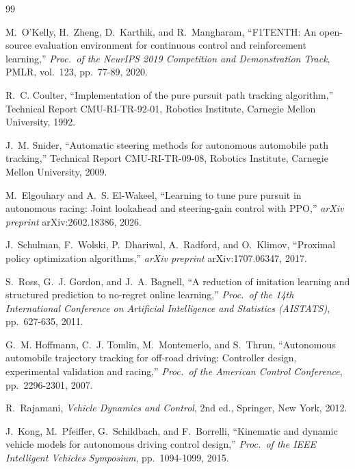 \documentclass[10pt,twocolumn,twoside]{article}
\begin{document}
\renewcommand{\refname}{References}
{\fontsize{9}{10.8}\selectfont
\begin{thebibliography}{99}
\setlength{\itemsep}{1pt}

M.~O'Kelly, H.~Zheng, D.~Karthik, and R.~Mangharam, ``F1TENTH: An
open-source evaluation environment for continuous control and reinforcement
learning,'' \emph{Proc.\ of the NeurIPS 2019 Competition and Demonstration
Track}, PMLR, vol.~123, pp.~77-89, 2020.

R.~C. Coulter, ``Implementation of the pure pursuit path tracking algorithm,''
Technical Report CMU-RI-TR-92-01, Robotics Institute, Carnegie Mellon
University, 1992.

J.~M. Snider, ``Automatic steering methods for autonomous automobile path
tracking,'' Technical Report CMU-RI-TR-09-08, Robotics Institute, Carnegie
Mellon University, 2009.

M.~Elgouhary and A.~S. El-Wakeel, ``Learning to tune pure pursuit in
autonomous racing: Joint lookahead and steering-gain control with PPO,''
\emph{arXiv preprint} arXiv:2602.18386, 2026.

J.~Schulman, F.~Wolski, P.~Dhariwal, A.~Radford, and O.~Klimov, ``Proximal
policy optimization algorithms,'' \emph{arXiv preprint} arXiv:1707.06347, 2017.

S.~Ross, G.~J. Gordon, and J.~A. Bagnell, ``A reduction of imitation learning
and structured prediction to no-regret online learning,'' \emph{Proc.\ of the
14th International Conference on Artificial Intelligence and Statistics
(AISTATS)}, pp.~627-635, 2011.

G.~M. Hoffmann, C.~J. Tomlin, M.~Montemerlo, and S.~Thrun, ``Autonomous
automobile trajectory tracking for off-road driving: Controller design,
experimental validation and racing,'' \emph{Proc.\ of the American Control
Conference}, pp.~2296-2301, 2007.

R.~Rajamani, \emph{Vehicle Dynamics and Control}, 2nd ed., Springer, New York,
2012.

J.~Kong, M.~Pfeiffer, G.~Schildbach, and F.~Borrelli, ``Kinematic and dynamic
vehicle models for autonomous driving control design,'' \emph{Proc.\ of the
IEEE Intelligent Vehicles Symposium}, pp.~1094-1099, 2015.


\end{thebibliography}}
\end{document}
